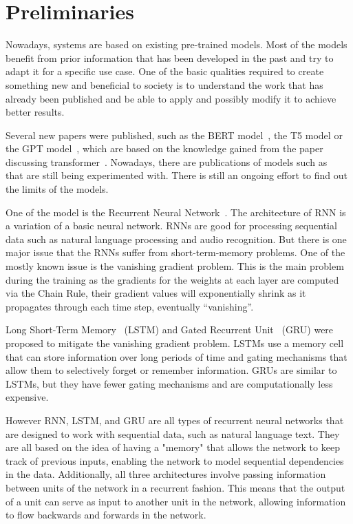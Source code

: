 
\chapter{Preliminaries}\label{c2}
Nowadays, systems are based on existing pre-trained models. Most of the models benefit from prior information that has been developed in the past and try to adapt it for a specific use case. One of the basic qualities required to create something new and beneficial to society is to understand the work that has already been published and be able to apply and possibly modify it to achieve better results.

Several new papers were published, such as the BERT model~\cite{bert}, the T5 model\cite{T5} or the GPT model~\cite{gpt}, which are based on the knowledge gained from the paper discussing transformer~\cite{transformer}. Nowadays, there are publications of models such as~\cite{gpt4} that are still being experimented with. There is still an ongoing effort to find out the limits of the models.

One of the model is the Recurrent Neural Network~\cite{rnn}\cite{elman}. The architecture of RNN is a variation of a basic neural network. RNNs are good for processing sequential data such as natural language processing and audio recognition. But there is one major issue that the RNNs suffer from short-term-memory problems. One of the mostly known issue is the vanishing gradient problem. This is the main problem during the training as the gradients for the weights at each layer are computed via the Chain Rule, their gradient values will exponentially shrink as it propagates through each time step, eventually “vanishing”.

Long Short-Term Memory~\cite{LSTM} (LSTM) and Gated Recurrent Unit~\cite{GRU} (GRU) were proposed to mitigate the vanishing gradient problem. LSTMs use a memory cell that can store information over long periods of time and gating mechanisms that allow them to selectively forget or remember information. GRUs are similar to LSTMs, but they have fewer gating mechanisms and are computationally less expensive.

However RNN, LSTM, and GRU are all types of recurrent neural networks that are designed to work with sequential data, such as natural language text. They are all based on the idea of having a "memory" that allows the network to keep track of previous inputs, enabling the network to model sequential dependencies in the data. Additionally, all three architectures involve passing information between units of the network in a recurrent fashion. This means that the output of a unit can serve as input to another unit in the network, allowing information to flow backwards and forwards in the network.

